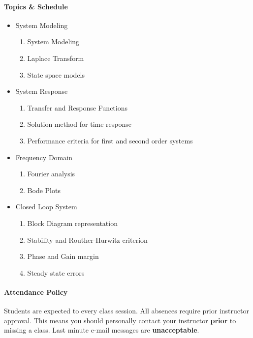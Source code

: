 \documentclass[11pt, reqno]{article}   	%
\begin{document}
\paragraph{Topics \& Schedule}
\begin{itemize}
    \item System Modeling
        \begin{enumerate}
            \item System Modeling
            \item Laplace Transform
            \item State space models
        \end{enumerate}
  
    \item System Response
        \begin{enumerate}
            \item Transfer and Response Functions
            \item Solution method for time response
            \item Performance criteria for first and second order systems
        \end{enumerate}
    \item Frequency Domain
        \begin{enumerate}
            \item Fourier analysis
            \item Bode Plots
        \end{enumerate}
    \item Closed Loop System 
        \begin{enumerate}
            \item Block Diagram representation
            \item Stability and Routher-Hurwitz criterion
            \item Phase and Gain margin
            \item Steady state errors
        \end{enumerate}
\end{itemize}

\paragraph{Attendance Policy} 
Students are expected to every class session.
All absences require prior instructor approval.
This means you should personally contact your instructor \textbf{prior} to missing a class.
Last minute e-mail messages are \textbf{unacceptable}.
\end{document}
